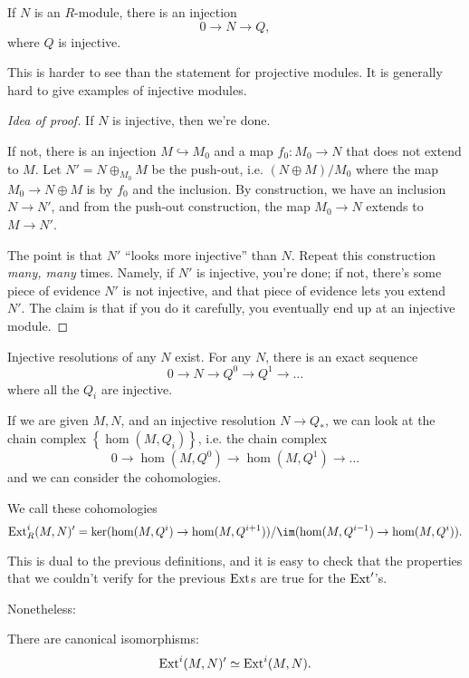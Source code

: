 \begin{proposition} 
If $N$ is an $R$-module, there is an injection
\[ 0 \to N \to Q,  \]
where $Q$ is injective.
\end{proposition} 
This is harder to see than the statement for projective modules. It is
generally hard to give examples of injective modules.
\begin{proof}[Idea of proof] If $N$ is injective, then we're done.

If not, there is an injection $M \hookrightarrow M_0$ and a map $f_0: M_0 \to N$
that does not extend to $M$. Let $N' = N \oplus_{M_0} M$ be the push-out, i.e.
$(N \oplus M)/M_0$ where the map $M_0 \to N \oplus M$ is by $f_0$ and the
inclusion. By construction, we have an inclusion $N \to N'$, and from the
push-out construction, the map $M_0 \to N$ extends to $M \to N'$. 

The point is that $N'$ ``looks more injective'' than $N$. Repeat this
construction \emph{many, many} times. Namely, if $N'$ is injective, you're
done; if not, there's some piece of evidence $N'$ is not injective, and that
piece of evidence lets you extend $N'$. The claim is that if you do it
carefully, you eventually end up at an injective module. 

\end{proof} 


\begin{corollary} 
Injective resolutions of any $N$ exist. For any $N$, there is an exact sequence
\[ 0 \to N \to Q^0 \to Q^1 \to \dots  \]
where all the $Q_i$ are injective.
\end{corollary} 

If we are given $M,N$, and an injective resolution $N \to Q_*$, we can look at
the chain complex $\left\{\hom(M,Q_i)\right\}$, i.e. the chain complex
\[ 0 \to \hom(M, Q^0) \to \hom(M, Q^1) \to \dots  \]
and we can consider the cohomologies.

\begin{definition} 
We call these cohomologies
\[ \ext^i_R(M,N)'  = \ker(\hom(M, Q^i) \to \hom(M, Q^{i+1}))/\im(\hom(M,
Q^{i-1}) \to \hom(M, Q^i)).  \]
\end{definition} 

This is dual to the previous definitions, and it is easy to check that the
properties that we couldn't verify for the previous $\mathrm{Ext}$s are true for the
$\mathrm{Ext}'$'s. 

Nonetheless:

\begin{theorem} 
There are canonical isomorphisms:
\[ \mathrm{Ext}^i(M,N)' \simeq \mathrm{Ext}^i(M,N).  \]
\end{theorem} 

